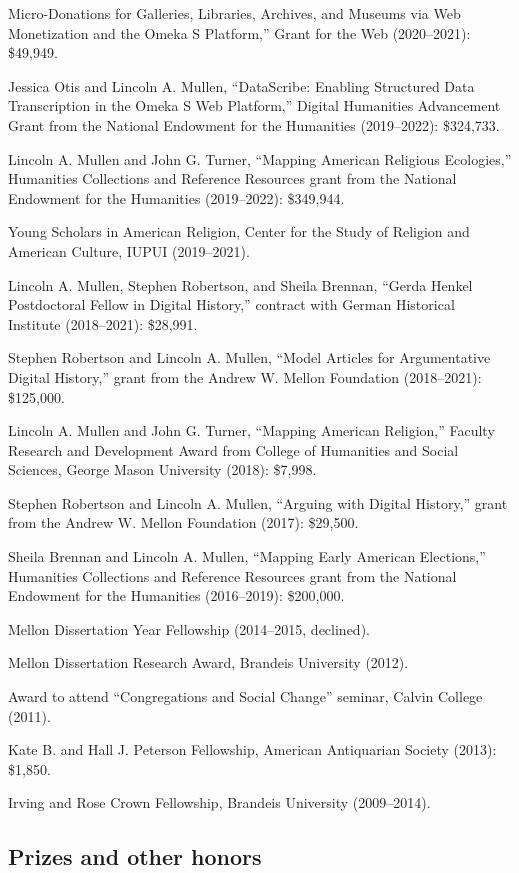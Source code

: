 \documentclass[11pt]{article}
\begin{document}
\noindent{}Micro-Donations for Galleries, Libraries, Archives, and Museums via Web Monetization and the Omeka S Platform,'' Grant for the Web (2020--2021): \$49,949.

Jessica Otis and Lincoln A. Mullen, ``DataScribe: Enabling Structured Data Transcription in the Omeka S Web Platform,'' Digital Humanities Advancement Grant from the National Endowment for the Humanities (2019--2022): \$324,733.

Lincoln A. Mullen and John G. Turner, ``Mapping American Religious Ecologies,'' Humanities Collections and Reference Resources grant from the National Endowment for the Humanities (2019--2022): \$349,944.

Young Scholars in American Religion, Center for the Study of Religion and American Culture, IUPUI (2019--2021).

Lincoln A. Mullen, Stephen Robertson, and Sheila Brennan, ``Gerda Henkel Postdoctoral Fellow in Digital History,'' contract with German Historical Institute (2018--2021): \$28,991.

Stephen Robertson and Lincoln A. Mullen, ``Model Articles for Argumentative Digital History,'' grant from the Andrew W. Mellon Foundation (2018--2021): \$125,000.

Lincoln A. Mullen and John G. Turner, ``Mapping American Religion,'' Faculty Research and Development Award from College of Humanities and Social Sciences, George Mason University (2018): \$7,998.

Stephen Robertson and Lincoln A. Mullen, ``Arguing with Digital History,'' grant from the Andrew W. Mellon Foundation (2017): \$29,500.

Sheila Brennan and Lincoln A. Mullen, ``Mapping Early American Elections,'' Humanities Collections and Reference Resources grant from the National Endowment for the Humanities (2016--2019): \$200,000. 

Mellon Dissertation Year Fellowship (2014--2015, declined).

Mellon Dissertation Research Award, Brandeis University (2012).

Award to attend ``Congregations and Social Change'' seminar, Calvin College (2011).

Kate B. and Hall J. Peterson Fellowship, American Antiquarian Society (2013): \$1,850.

Irving and Rose Crown Fellowship, Brandeis University (2009--2014).

\subsection{Prizes and other honors}\label{Prizes}
\end{document}
